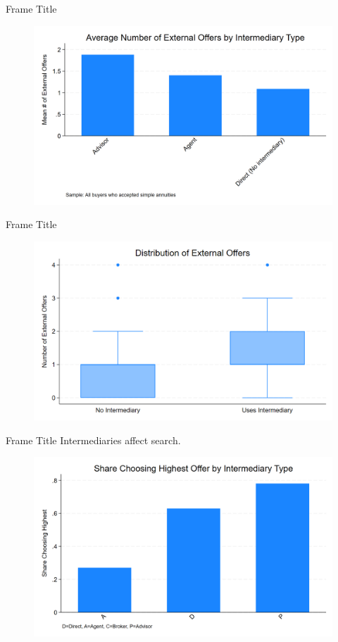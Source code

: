\documentclass[10pt,aspectratio=169]{beamer}
\begin{document}
\begin{frame}{Frame Title}
 \begin{figure}
     \centering
     \includegraphics[width=0.6\linewidth]{figures//IE4/IE4_external_offers_by_intermediary.png}
     \label{fig:placeholder}
 \end{figure}
\end{frame}



 \begin{frame}{Frame Title}
 \begin{figure}
     \centering
     \includegraphics[width=0.6\linewidth]{figures//IE4/IE4_intermediary_search_box.png}
     \label{fig:placeholder}
 \end{figure}
\end{frame}


 
 \begin{frame}{Frame Title}
 Intermediaries affect search. 
 \begin{figure}
     \centering
     \includegraphics[width=0.6\linewidth]{figures//IE4/IE4_highest_by_intermediary_type.png}
     \label{fig:placeholder}
 \end{figure}
\end{frame}
\end{document}
